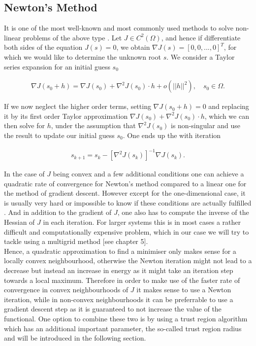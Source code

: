 \documentclass[../draft_1.tex]{subfiles}
\begin{document}
\subsection{Newton's Method}
It is one of the most well-known and most commonly used methods to solve non-linear problems of the above type \cite{briggs2000multigrid}. Let $J \in C^2(\Omega)$, and hence if differentiate both sides of the equation $J(s) = 0$, we obtain $\nabla J(s) =  [0, 0, ..., 0]^T$, for which we would like to determine the unknown root $s$. We consider a Taylor series expansion for an initial guess $s_0$
\begin{ceqn}
\begin{equation}
\begin{aligned}
\nabla J(s_0 + h) = \nabla J(s_0) + \nabla^2 J(s_0) \cdot h + o(||h||^2), \quad s_0 \in \Omega.
\end{aligned}
\end{equation}
\end{ceqn}
If we now neglect the higher order terms, setting $\nabla J(s_0+h) = 0$ and replacing it by its first order Taylor approximation $\nabla J(s_0) + \nabla^2 J(s_0) \cdot h$, which we can then solve for $h$, under the assumption that $\nabla^2 J(s_0)$ is non-singular and use the result to update our initial guess $s_0$.  One ends up the with iteration 

\begin{ceqn}
\begin{equation}
\begin{aligned}
s_{k+1} = s_k - [\nabla^2 J(s_k)]^{-1} \nabla J (s_k). 
\end{aligned}
\end{equation}
\end{ceqn}

In the case of $J$ being convex and a few additional conditions one can achieve a quadratic rate of convergence for Newton's method compared to a linear one for the method of gradient descent. However except for the one-dimensional case, it is usually very hard or impossible to know if these conditions are actually fulfilled \cite{deuflhard2011newton}. And in addition to the gradient of $J$, one also has to compute the inverse of the Hessian of $J$ in each iteration. For larger systems this is in most cases a rather difficult and computationally expensive problem, which in our case we will try to tackle using a multigrid method [see chapter 5]. 
\smallskip
\\
Hence, a quadratic approximation to find a minimiser only makes sense for a locally convex neighbourhood, otherwise the Newton iteration might not lead to a decrease but instead an increase in energy as it might take an iteration step towards a local maximum. Therefore in order to make use of the faster rate of convergence in convex neighbourhoods of $J$ it makes sense to use a Newton iteration, while in non-convex neighbourhoods it can be preferrable to use a gradient descent step as it is guaranteed to not increase the value of the functional. One option to combine these two is by using a trust region algorithm which has an additional important parameter, the so-called trust region radius and will be introduced in the following section.
\end{document}
